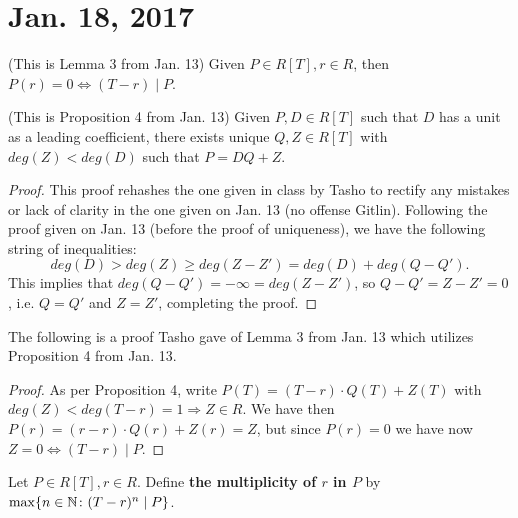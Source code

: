 \section{Jan. 18, 2017}
\begin{lemma}
(This is Lemma 3 from Jan. 13) Given $P \in R[T], r \in R$, then $P(r) = 0 \Leftrightarrow (T - r) \mid P$.
\end{lemma}

\begin{prop}
(This is Proposition 4 from Jan. 13) Given $P, D \in R[T]$ such that $D$ has a unit as a leading coefficient, there exists unique $Q, Z \in R[T]$ with $deg(Z) < deg(D)$ such that $P = DQ + Z$.
\end{prop}

\begin{proof}
This proof rehashes the one given in class by Tasho to rectify any mistakes or lack of clarity in the one given on Jan. 13 (no offense Gitlin). Following the proof given on Jan. 13 (before the proof of uniqueness), we have the following string of inequalities:
\[deg(D) > deg(Z) \geq deg(Z - Z') = deg(D) + deg(Q - Q').\]
This implies that $deg(Q - Q') = -\infty = deg(Z - Z')$, so $Q - Q' = Z - Z' = 0$, i.e. $Q = Q'$ and $Z = Z'$, completing the proof.
\end{proof}

The following is a proof Tasho gave of Lemma 3 from Jan. 13 which utilizes Proposition 4 from Jan. 13.
\begin{proof}
As per Proposition 4, write $P(T) = (T - r) \cdot Q(T) + Z(T)$ with $deg(Z) < deg(T - r) = 1 \Rightarrow Z \in R$. We have then $P(r) = (r - r) \cdot Q(r) + Z(r) = Z$, but since $P(r) = 0$ we have now $Z = 0 \Leftrightarrow (T - r) \mid P$.
\end{proof}

\begin{defn}
Let $P \in R[T], r \in R$. Define \textbf{the multiplicity of $r$ in $P$} by $\max\{n \in \mathbb{N} \colon (T - r)^n \mid P\}$.
\end{defn}

